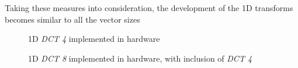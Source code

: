 Taking these measures into consideration, the development of the 1D transforms becomes similar to all the vector sizes

\begin{figure}[!htbp]
    \centering
    
    \caption{1D \emph{DCT 4} implemented in hardware}
    \label{fig:harddct4v1}
\end{figure}

\begin{figure}[!htbp]
    \centering
    
    \caption{1D \emph{DCT 8} implemented in hardware, with inclusion of \emph{DCT 4}}
    \label{fig:harddct8v1}
\end{figure}

\clearpage
\printbibliography[heading=subbibliography]
